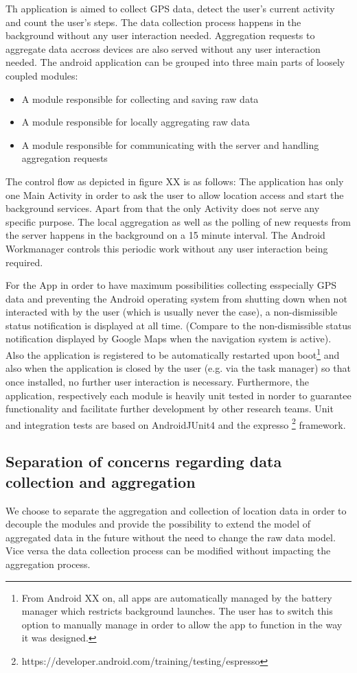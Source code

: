 Th application is aimed to collect GPS data, detect the user's current activity and count the user's steps. The data collection process happens in the background without any user interaction needed. Aggregation requests to aggregate data accross devices are also served without any user interaction needed.
The android application can be grouped into three main parts of loosely coupled modules:
\begin{itemize}
	\item A module responsible for collecting and saving raw data
	\item A module responsible for locally aggregating raw data
	\item A module responsible for communicating with the server and handling aggregation requests
\end{itemize}
The control flow as depicted in figure XX is as follows: 
The application has only one Main Activity in order to ask the user to allow location access and start the background services. Apart from that the only Activity does not serve any specific purpose. 
The local aggregation as well as the polling of new requests from the server happens in the background on a 15 minute interval. The Android Workmanager controls this periodic work without any user interaction being required.

For the App in order to have maximum possibilities collecting esspecially GPS data and preventing the Android operating system from shutting down when not interacted with by the user (which is usually never the case), a non-dismissible status notification is displayed at all time. (Compare to the non-dismissible status notification displayed by Google Maps when the navigation system is active). Also the application is registered to be automatically restarted upon boot\footnote{From Android XX on, all apps are automatically managed by the battery manager which restricts background launches. The user has to switch this option to manually manage in order to allow the app to function in the way it was designed.} and also when the application is closed by the user (e.g. via the task manager) so that once installed, no further user interaction is necessary.
Furthermore, the application, respectively each module is heavily unit tested in norder to guarantee functionality and facilitate further development by other research teams. Unit and integration tests are based on AndroidJUnit4 and the expresso \footnote{https://developer.android.com/training/testing/espresso} framework.

\subsection{Separation of concerns regarding data collection and aggregation}
We choose to separate the aggregation and collection of location data in order to decouple the modules and provide the possibility to extend the model of aggregated data in the future without the need to change the raw data model. Vice versa the data collection process can be modified without impacting the aggregation process.

